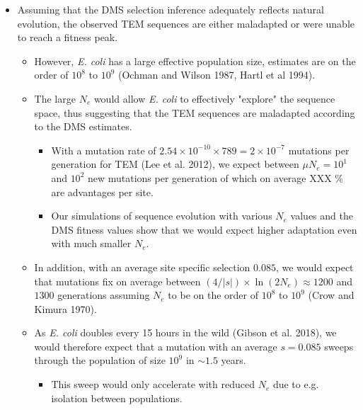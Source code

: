 \documentclass[12pt]{article}
\begin{document}
\begin{itemize}
	\item Assuming that the DMS selection inference adequately reflects natural evolution, the observed TEM sequences are either maladapted or were unable to reach a fitness peak.
	\begin{itemize}
		\item However, \textit{E. coli} has a large effective population size, estimates are on the order of $10^8$ to $10^9$ (Ochman and Wilson 1987, Hartl et al 1994).
		\item The large $N_e$ would allow \textit{E. coli} to effectively "explore" the sequence space, thus suggesting that the TEM sequences are maladapted according to the DMS estimates.
		\begin{itemize}
			\item With a mutation rate of $2.54\times 10^{-10} \times 789 = 2\times 10^{-7}$ mutations per generation for TEM (Lee et al. 2012), we expect between $\mu N_e = 10^1$ and $10^2$ new mutations per generation of which on average XXX \% are advantages per site.
			\item Our simulations of sequence evolution with various $N_e$ values and the DMS fitness values show that we would expect higher adaptation even with much smaller $N_e$.
		\end{itemize}
		\item In addition, with an average site specific selection $0.085$, we would expect that mutations fix on average between $(4/|s|)\times \ln(2N_e) \approx 1200$ and $1300$ generations assuming $N_e$ to be on the order of $10^8$ to $10^9$ (Crow and Kimura 1970).
		\item As \textit{E. coli} doubles every 15 hours in the wild (Gibson et al. 2018), we would therefore expect that a mutation with an average $s = 0.085$ sweeps through the population of size $10^9$ in $\sim 1.5$ years.
		\begin{itemize}
			\item This sweep would only accelerate with reduced $N_e$ due to e.g. isolation between populations.
		\end{itemize}
	\end{itemize}
	

\end{itemize}
\end{document}
